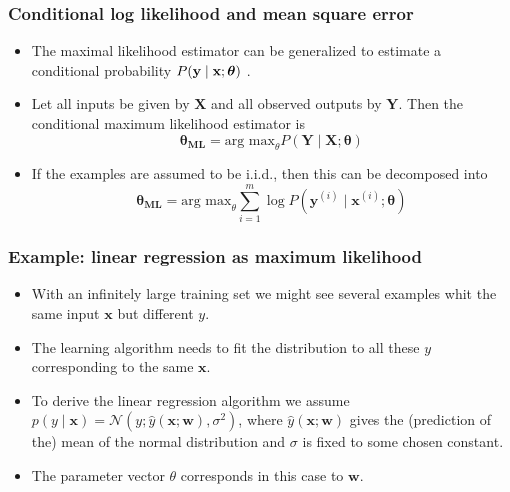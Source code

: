 \documentclass[notes]{beamer}          %
\newcommand{\vect}[1]{\bm{#1}}
\newif\iffull
\begin{document}
\begin{frame}
\frametitle{Conditional log likelihood and mean square error}
    \begin{itemize}
        \item The maximal likelihood estimator can be generalized to estimate a conditional probability $P(\text{\bf y} \mid \text{\bf x} ; \vect{\theta})$ .
        \item Let all inputs be given by $\vect{X}$ and all observed outputs by $\vect{Y}$. Then the conditional maximum likelihood estimator is
        $$
        \vect{\theta_{\mbox{ML}}} = \mbox{arg max}_{\theta} P(\vect{Y} \mid \vect{X}; \vect{\theta})
        $$
        \item If the examples are assumed to be i.i.d., then this can be decomposed into
        $$
        \vect{\theta_{\mbox{ML}}} = \mbox{arg max}_{\theta} \sum_{i=1}^{m} \log P(\vect{y}^{(i)} \mid \vect{x}^{(i)}; \vect{\theta})
        $$
    \end{itemize}
\end{frame}

\iffull
\begin{frame}
\frametitle{Example: linear regression as maximum likelihood}
    \begin{itemize}
        \item The linear regression seen as an algorithm that learns to take an input $\vect{x}$ and produce output $\hat{y}$.
        \item This function from $\vect{x}$ to $\hat{y}$ is chosen to minimize the mean squared error.
        \item This criterion was introduced more or less arbitrarily.
        \item We revisit linear regression from the point of view of maximal likelihood.
        \item We think of the model as producing a conditional distribution $p(y \mid \vect{x})$ instead of a single prediction $\hat{y}$.
    \end{itemize}
\end{frame}
\fi

\begin{frame}
\frametitle{Example: linear regression as maximum likelihood}
    \begin{itemize}
        \item With an infinitely large training set we might see several examples whit the same input $\vect{x}$ but different $y$.
        \item The learning algorithm needs to fit the distribution to all these $y$ corresponding to the same $\vect{x}$.
        \item To derive the linear regression algorithm we assume $p(y \mid \vect{x}) = \mathcal{N}(y; \hat{y}(\vect{x};\vect{w}), \sigma^2)$, where $\hat{y}(\vect{x};\vect{w})$ gives the (prediction of the) mean of the normal distribution and $\sigma$ is fixed to some chosen constant.
        \item The parameter vector $\theta$ corresponds in this case to $\vect{w}$.
    \end{itemize}
\end{frame}
\end{document}
